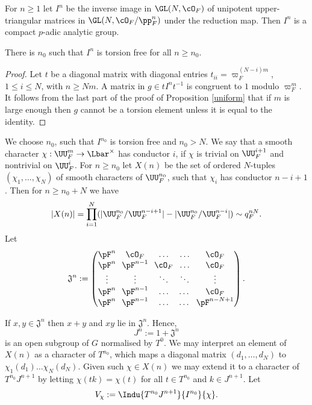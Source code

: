 For $n\ge 1$ let $I^n$ be the inverse image in $\GL(N, \cO_F)$ of unipotent upper-triangular matrices
in $\GL(N, \cO_{F}/\pp_F^n)$ under the reduction map. Then $I^n$ is a compact $p$-adic analytic group.

\begin{lem} There is $n_0$ such that $I^n$ is torsion free for all $n\ge n_0$.
\end{lem}

\begin{proof} Let $t$ be a diagonal matrix with diagonal entries $t_{ii}= \varpi_F^{(N-i) m}$, $1\le i\le N$, with $n\ge Nm $.
A matrix in $g\in t I^n t^{-1}$ is congruent to $1$ modulo $\varpi_F^m$. It follows from the last part
of the proof of Proposition \ref{uniform} that if $m$ is large enough then
$g$ cannot be a torsion element unless it is equal to the identity.
\end{proof}

We choose $n_0$, such that $I^{n_0}$ is torsion free and $n_0> N$. We say that a smooth character $\chi: \UU^{m}_F\to \Lbar^{\times}$ has conductor $i$, if $\chi$ is trivial on $\UU^{i+1}_F$ and nontrivial on $\UU^i_F$.
For $n\ge n_0$ let $X(n)$ be the set of ordered $N$-tuples $(\chi_1, \ldots, \chi_N)$ of smooth characters of $\UU^{n_0}_F$, such that $\chi_i$ has conductor $n-i+1$. Then for $n\ge n_0 +N$ we have
\begin{equation} \label{size_X_n}
|X(n)|= \prod_{i=1}^N (|\UU^{n_0}_F/\UU^{n-i+1}_F| -|\UU^{n_0}_F/\UU^{n-i}_F|)\sim q_F^{nN}.
\end{equation}
Let
\[\arraycolsep3.5pt
\mathfrak J^n:=\begin{pmatrix}\pF^n & \cO_F & \ldots & \ldots& \cO_F\\
\pF^n & \pF^{n-1}&\cO_F& \ldots & \cO_F\\
\vdots & \vdots &\ddots & \ddots & \vdots\\
\pF^n & \pF^{n-1} & \ldots &\dots & \cO_F \\
\pF^n & \pF^{n-1} & \ldots &\dots & \pF^{n-N+1}\end{pmatrix}.
\]

If $x, y\in \mathfrak J^n$ then $x+y$ and $xy$ lie in $\mathfrak J^n$. Hence,
\[
J^n:= 1 +\mathfrak J^n
\]
is an open subgroup of $G$ normalised by $T^0$. We may interpret an element of $X(n)$ as a character of $T^{n_0}$, which maps a
diagonal matrix $(d_1, \ldots, d_N)$ to $\chi_1(d_1)\ldots \chi_N(d_N)$. Given such $\chi\in X(n)$ we may extend it to a character of $T^{n_0} J^{n+1}$ by letting $\chi(tk)=\chi(t)$ for all $t\in T^{n_0}$
and $k\in J^{n+1}$. Let
\[
V_{\chi}:= \Indu{T^{n_0} J^{n+1}}{I^{n_0}}{\chi}.
\]

